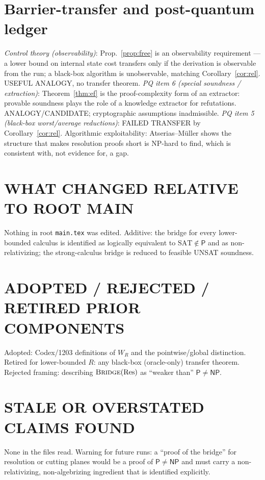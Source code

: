 \documentclass[11pt]{article}
\newcommand{\SAT}{\mathrm{SAT}}
\newcommand{\Pclass}{\mathsf{P}}
\newcommand{\NP}{\mathsf{NP}}
\begin{document}
\section*{Barrier-transfer and post-quantum ledger}
\emph{Control theory (observability)}: Prop.~\ref{prop:free} is an observability
requirement --- a lower bound on internal state cost transfers only if the derivation is
observable from the run; a black-box algorithm is unobservable, matching
Corollary~\ref{cor:rel}. USEFUL ANALOGY, no transfer theorem. \emph{PQ item 6
(special soundness / extraction)}: Theorem~\ref{thm:ef} is the proof-complexity form of
an extractor: provable soundness plays the role of a knowledge extractor for refutations.
ANALOGY/CANDIDATE; cryptographic assumptions inadmissible. \emph{PQ item 5 (black-box
worst/average reductions)}: FAILED TRANSFER by Corollary~\ref{cor:rel}.
Algorithmic exploitability: Atserias--M\"uller shows the structure that makes resolution
proofs short is NP-hard to find, which is consistent with, not evidence for, a gap.

\section*{WHAT CHANGED RELATIVE TO ROOT MAIN}
Nothing in root \texttt{main.tex} was edited. Additive: the bridge for every lower-bounded
calculus is identified as logically equivalent to $\SAT\notin\Pclass$ and as non-relativizing;
the strong-calculus bridge is reduced to feasible UNSAT soundness.

\section*{ADOPTED / REJECTED / RETIRED PRIOR COMPONENTS}
Adopted: Codex/1203 definitions of $W_R$ and the pointwise/global distinction.
Retired for lower-bounded $R$: any black-box (oracle-only) transfer theorem.
Rejected framing: describing $\textsc{Bridge}(\mathrm{Res})$ as ``weaker than'' $\Pclass\neq\NP$.

\section*{STALE OR OVERSTATED CLAIMS FOUND}
None in the files read. Warning for future runs: a ``proof of the bridge'' for resolution or
cutting planes would be a proof of $\Pclass\neq\NP$ and must carry a non-relativizing,
non-algebrizing ingredient that is identified explicitly.
\end{document}
